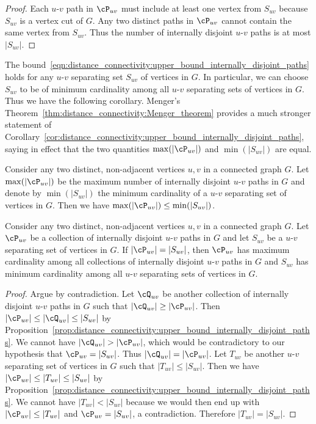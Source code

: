 \begin{proof}
Each $u$-$v$ path in $\cP_{uv}$ must include at least one vertex from
$S_{uv}$ because $S_{uv}$ is a vertex cut of $G$. Any two distinct
paths in $\cP_{uv}$ cannot contain the same vertex from $S_{uv}$. Thus
the number of internally disjoint $u$-$v$ paths is at most $|S_{uv}|$.
\end{proof}

The
bound~\eqref{eqn:distance_connectivity:upper_bound_internally_disjoint_paths}
holds for any $u$-$v$ separating set $S_{uv}$ of vertices in $G$. In
particular, we can choose $S_{uv}$ to be of minimum cardinality among
all $u$-$v$ separating sets of vertices in $G$. Thus we have the
following corollary. Menger's
Theorem~\ref{thm:distance_connectivity:Menger_theorem} provides a much
stronger statement of
Corollary~\ref{cor:distance_connectivity:upper_bound_internally_disjoint_paths},
saying in effect that the two quantities $\max(|\cP_{uv}|)$ and
$\min(|S_{uv}|)$ are equal.

\begin{corollary}
\label{cor:distance_connectivity:upper_bound_internally_disjoint_paths}
Consider any two distinct, non-adjacent vertices $u,v$ in a connected
graph $G$. Let $\max(|\cP_{uv}|)$ be the maximum number of internally
disjoint $u$-$v$ paths in $G$ and denote by $\min(|S_{uv}|)$ the
minimum cardinality of a $u$-$v$ separating set of vertices in
$G$. Then we have $\max(|\cP_{uv}|) \leq \min(|S_{uv}|)$.
\end{corollary}

\begin{corollary}
Consider any two distinct, non-adjacent vertices $u,v$ in a connected
graph $G$. Let $\cP_{uv}$ be a collection of internally disjoint
$u$-$v$ paths in $G$ and let $S_{uv}$ be a $u$-$v$ separating set of
vertices in $G$. If $|\cP_{uv}| = |S_{uv}|$, then $\cP_{uv}$ has
maximum cardinality among all collections of internally disjoint
$u$-$v$ paths in $G$ and $S_{uv}$ has minimum cardinality among all
$u$-$v$ separating sets of vertices in $G$.
\end{corollary}

\begin{proof}
Argue by contradiction. Let $\cQ_{uv}$ be another collection of
internally disjoint $u$-$v$ paths in $G$ such that
$|\cQ_{uv}| \geq |\cP_{uv}|$. Then
$|\cP_{uv}| \leq |\cQ_{uv}| \leq |S_{uv}|$ by
Proposition~\ref{prop:distance_connectivity:upper_bound_internally_disjoint_paths}.
We cannot have $|\cQ_{uv}| > |\cP_{uv}|$, which would be contradictory
to our hypothesis that $\cP_{uv} = |S_{uv}|$. Thus
$|\cQ_{uv}| = |\cP_{uv}|$. Let $T_{uv}$ be another $u$-$v$
separating set of vertices in $G$ such that
$|T_{uv}| \leq |S_{uv}|$. Then we have
$|\cP_{uv}| \leq |T_{uv}| \leq |S_{uv}|$ by
Proposition~\ref{prop:distance_connectivity:upper_bound_internally_disjoint_paths}.
We cannot have $|T_{uv}| < |S_{uv}|$ because we would then end up with
$|\cP_{uv}| \leq |T_{uv}|$ and $\cP_{uv} = |S_{uv}|$, a
contradiction. Therefore $|T_{uv}| = |S_{uv}|$.
\end{proof}


